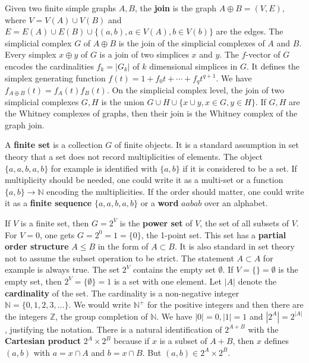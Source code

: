 \documentclass[12pt]{amsart}
\begin{document}
\vspace{3mm}
Given two finite simple graphs $A,B$, the {\bf join} is the
graph $A \oplus B = (V,E)$, where $V=V(A) \cup V(B)$ and $E=E(A) \cup E(B) \cup \{ (a,b), a \in V(A), b \in V(b) \}$
are the edges. The simplicial complex $G$ of $A \oplus B$ is the join of the simplicial complexes
of $A$ and $B$. Every simplex $x \oplus y$ of $G$ is a join of two simplices $x$ and $y$. The $f$-vector of $G$ 
encodes the cardinalities $f_k=|G_k|$  of $k$ dimensional simplices in $G$. It defines the simplex generating 
function $f(t) = 1 + f_0 t + \cdots + f_q t^{q+1}$. We have $f_{A \oplus B}(t) = f_A(t) f_B(t)$. 
On the simplicial complex level, the join of two simplicial complexes $G,H$ is the union 
$G \cup H \cup \{ x \cup y, x \in G, y \in H \}$. If $G,H$ are the Whitney complexes of graphs, then their
join is the Whitney complex of the graph join. 

\vspace{3mm}
A {\bf finite set} is a collection $G$ of finite objects. It is a standard assumption
in set theory that a set does not record multiplicities of elements. The object $\{a,a,b,a,b\}$ 
for example is identified with $\{a,b\}$ if it is considered to be a set. 
If multiplicity should be needed, one could write it as a multi-set or a function 
$\{a,b\} \to \mathbb{N}$ encoding the multiplicities. If the order should matter, 
one could write it as a {\bf finite sequence} $\{ a,a,b,a,b \}$ or a {\bf word} $aabab$ over an 
alphabet.

\vspace{3mm}
If $V$ is a finite set, then $G=2^{V}$ is the {\bf power set} of $V$, the
set of all subsets of $V$. For $V=0$, one gets $G=2^0=1=\{0\}$, the 1-point set.
This set has a {\bf partial order structure}
$A \leq B$ in the form of $A \subset B$. It is also standard in set theory not to assume
the subset operation to be strict. The statement $A \subset A$ for example is always true. 
The set $2^V$ contains the empty set $\emptyset$. If $V=\{\} =\emptyset$ is the empty 
set, then $2^{V}=\{ \emptyset \} =1$ is a set with one element. 
Let $|A|$ denote the {\bf cardinality} of the set. The cardinality is a non-negative integer
$\mathbb{N}=\{0,1,2,3, \dots \}$. We would write $\mathbb{N}^+$ for the positive integers
and then there are the integers $\mathbb{Z}$, the group completion of $\mathbb{N}$. 
We have $|0|=0,|1|=1$ and $|2^A|=2^{|A|}$, justifying the notation. 
There is a natural identification of $2^{A+B}$ with the {\bf Cartesian product} $2^A \times 2^B$
because if $x$ is a subset of $A + B$, then $x$ defines $(a,b)$ with $a = x \cap A$ and 
$b=x \cap B$. But $(a,b) \in 2^A \times 2^B$. 
\end{document}
